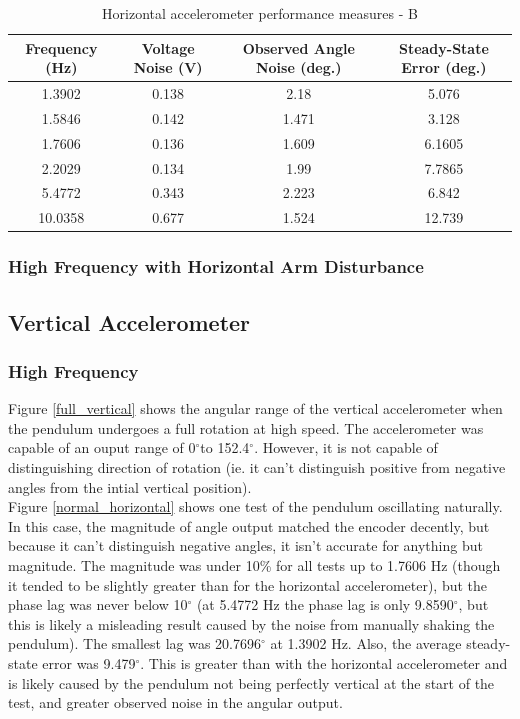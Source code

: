 \documentclass{article}
\theoremstyle{plain}
\theoremstyle{definition}
\theoremstyle{remark}
\begin{document}
\begin{table}
\begin{center}
    \begin{tabular}{|c|c|c|c|}
        \hline
        Frequency (Hz)  & Voltage Noise (V) & Observed Angle Noise (deg.) & Steady-State Error (deg.) \\ \hline
	1.3902  & 0.138  & 2.18 & 5.076\\
       1.5846  & 0.142  & 1.471 & 3.128 \\
	1.7606  & 0.136 & 1.609 & 6.1605  \\
	2.2029 & 0.134  & 1.99 & 7.7865   \\
	5.4772 & 0.343  & 2.223 & 6.842  \\
	10.0358 & 0.677 & 1.524 & 12.739 \\
        \hline
    \end{tabular}
\caption{Horizontal accelerometer performance measures - B}  
\label{horizontal_tableB}
\end{center}
\end{table}


\subsubsection{High Frequency with Horizontal Arm Disturbance}
\clearpage

\subsection{Vertical Accelerometer}
\subsubsection{High Frequency}

Figure \ref{full_vertical} shows the angular range of the vertical accelerometer when the pendulum undergoes a full rotation at high speed. The accelerometer was capable of an ouput range of 0$^{\circ}$to 152.4$^{\circ}$. However, it is not capable of distinguishing direction of rotation (ie. it can't distinguish positive from negative angles from the intial vertical position). \\

Figure \ref{normal_horizontal} shows one test of the pendulum oscillating naturally. In this case, the magnitude of angle output matched the encoder decently, but because it can't distinguish negative angles, it isn't accurate for anything but magnitude. The magnitude was under 10\% for all tests up to 1.7606 Hz (though it tended to be slightly greater than for the horizontal accelerometer), but the phase lag was never below 10$^{\circ}$ (at 5.4772 Hz the phase lag is only 9.8590$^{\circ}$, but this is likely a misleading result caused by the noise from manually shaking the pendulum). The smallest lag was 20.7696$^{\circ}$ at 1.3902 Hz. Also, the average steady-state error was 9.479$^{\circ}$. This is greater than with the horizontal accelerometer and is likely caused by the pendulum not being perfectly vertical at the start of the test, and greater observed noise in the angular output.\\ 
\end{document}
